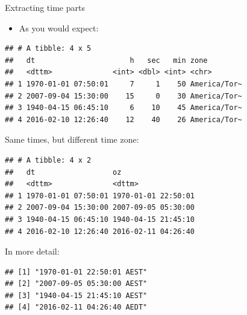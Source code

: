 \documentclass[
  ignorenonframetext,
]{beamer}
\newenvironment{Shaded}{\begin{snugshade}}{\end{snugshade}}
\newcommand{\DataTypeTok}[1]{\textcolor[rgb]{0.13,0.29,0.53}{#1}}
\newcommand{\KeywordTok}[1]{\textcolor[rgb]{0.13,0.29,0.53}{\textbf{#1}}}
\newcommand{\NormalTok}[1]{#1}
\newcommand{\OperatorTok}[1]{\textcolor[rgb]{0.81,0.36,0.00}{\textbf{#1}}}
\newcommand{\StringTok}[1]{\textcolor[rgb]{0.31,0.60,0.02}{#1}}
\providecommand{\tightlist}{%
  \setlength{\itemsep}{0pt}\setlength{\parskip}{0pt}}
\begin{document}
\begin{frame}[fragile]{Extracting time parts}
\protect\hypertarget{extracting-time-parts}{}

\begin{itemize}
\tightlist
\item
  As you would expect:
\end{itemize}

\begin{Shaded}
\end{Shaded}

\begin{verbatim}
## # A tibble: 4 x 5
##   dt                      h   sec   min zone        
##   <dttm>              <int> <dbl> <int> <chr>       
## 1 1970-01-01 07:50:01     7     1    50 America/Tor~
## 2 2007-09-04 15:30:00    15     0    30 America/Tor~
## 3 1940-04-15 06:45:10     6    10    45 America/Tor~
## 4 2016-02-10 12:26:40    12    40    26 America/Tor~
\end{verbatim}

\end{frame}

\begin{frame}[fragile]{Same times, but different time zone:}
\protect\hypertarget{same-times-but-different-time-zone}{}

\begin{Shaded}
\end{Shaded}

\begin{verbatim}
## # A tibble: 4 x 2
##   dt                  oz                 
##   <dttm>              <dttm>             
## 1 1970-01-01 07:50:01 1970-01-01 22:50:01
## 2 2007-09-04 15:30:00 2007-09-05 05:30:00
## 3 1940-04-15 06:45:10 1940-04-15 21:45:10
## 4 2016-02-10 12:26:40 2016-02-11 04:26:40
\end{verbatim}

In more detail:

\begin{verbatim}
## [1] "1970-01-01 22:50:01 AEST"
## [2] "2007-09-05 05:30:00 AEST"
## [3] "1940-04-15 21:45:10 AEST"
## [4] "2016-02-11 04:26:40 AEDT"
\end{verbatim}

\end{frame}
\end{document}
